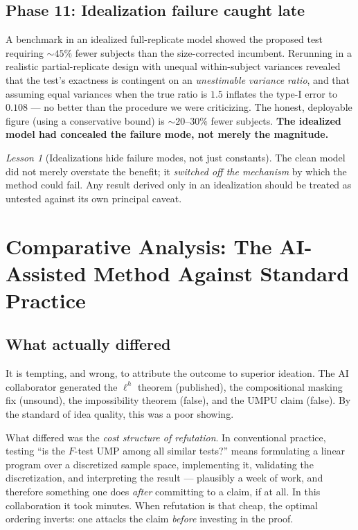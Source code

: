 \documentclass[11pt]{article}
\theoremstyle{remark}
\newtheorem{lesson}{Lesson}
\begin{document}
\subsection{Phase 11: Idealization failure caught late}
A benchmark in an idealized full-replicate model showed the proposed test requiring $\sim\!45\%$ fewer subjects than the size-corrected incumbent. Rerunning in a realistic partial-replicate design with unequal within-subject variances revealed that the test's exactness is contingent on an \emph{unestimable variance ratio}, and that assuming equal variances when the true ratio is $1.5$ inflates the type-I error to $0.108$ --- no better than the procedure we were criticizing. The honest, deployable figure (using a conservative bound) is $\sim\!20$--$30\%$ fewer subjects. \textbf{The idealized model had concealed the failure mode, not merely the magnitude.}

\begin{lesson}[Idealizations hide failure modes, not just constants]
The clean model did not merely overstate the benefit; it \emph{switched off the mechanism} by which the method could fail. Any result derived only in an idealization should be treated as untested against its own principal caveat.
\end{lesson}

\section{Comparative Analysis: The AI-Assisted Method Against Standard Practice}
\label{sec:comparative}

\subsection{What actually differed}
It is tempting, and wrong, to attribute the outcome to superior ideation. The AI collaborator generated the $\ell^h$ theorem (published), the compositional masking fix (unsound), the impossibility theorem (false), and the UMPU claim (false). By the standard of idea quality, this was a poor showing.

What differed was the \emph{cost structure of refutation}. In conventional practice, testing ``is the $F$-test UMP among all similar tests?'' means formulating a linear program over a discretized sample space, implementing it, validating the discretization, and interpreting the result --- plausibly a week of work, and therefore something one does \emph{after} committing to a claim, if at all. In this collaboration it took minutes. When refutation is that cheap, the optimal ordering inverts: one attacks the claim \emph{before} investing in the proof.
\end{document}
